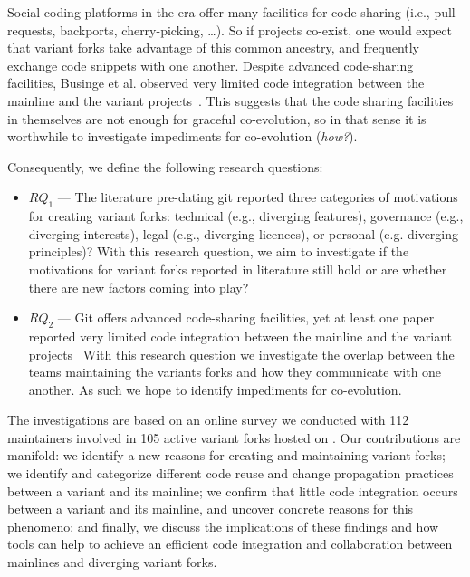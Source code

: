 Social coding platforms in the \gh era offer many facilities for code sharing (i.e., pull requests, backports, cherry-picking, \ldots).
So if projects co-exist, one would expect that variant forks take advantage of this common ancestry, and frequently exchange code snippets with one another.
Despite advanced code-sharing facilities, Businge et al. observed very limited code integration between the mainline and the variant projects~\cite{businge:emse:2021}.
This suggests that the code sharing facilities in themselves are not enough for graceful co-evolution, so in that sense it is worthwhile to investigate impediments for co-evolution (\textit{how?}).


\newcommand*{\RQOne} [1] {Why do developers create and maintain variants on \gh?}
\newcommand*{\RQTwo} [1] {How do variant projects evolve with respect to the mainline?}


\noindent
Consequently, we define the following research questions:
\begin{itemize}
\item $RQ_1$ --- \textit{\RQOne}
The literature pre-dating git reported three categories of motivations for creating variant forks: technical (e.g., diverging features), governance (e.g., diverging interests), legal (e.g., diverging licences), or personal (e.g. diverging principles)?
With this research question, we aim to investigate if the motivations for variant forks reported in literature still hold or are whether there are new factors coming into play? 

\item $RQ_2$ --- \textit{\RQTwo}
Git offers advanced code-sharing facilities, yet at least one paper reported very limited code integration between the mainline and the variant projects~\cite{businge:emse:2021}
With this research question we investigate the overlap between the teams maintaining the variants forks and how they communicate with one another.
As such we hope to identify impediments for co-evolution.
\end{itemize}


The investigations are based on an online survey we conducted with 112 maintainers involved in 105 active variant forks hosted on \gh.
%
Our contributions are manifold:
we identify a new reasons for creating and maintaining variant forks;
we identify and categorize different code reuse and change propagation practices between a variant and its mainline;
we confirm that little code integration occurs between a variant and its mainline, and uncover concrete reasons for this phenomeno;
and finally, we discuss the implications of these findings and how tools can help to achieve an efficient code integration and collaboration between mainlines and diverging variant forks.

